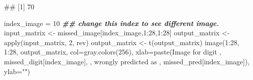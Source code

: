 \documentclass[
  12pt,
]{krantz}
\makeatletter
\newenvironment{Shaded}{\begin{snugshade}}{\end{snugshade}}
\newcommand{\AttributeTok}[1]{\textcolor[rgb]{0.61,0.61,0.61}{#1}}
\newcommand{\DecValTok}[1]{\textcolor[rgb]{0.06,0.06,0.06}{#1}}
\newcommand{\DocumentationTok}[1]{\textcolor[rgb]{0.37,0.37,0.37}{\textbf{\textit{#1}}}}
\newcommand{\FunctionTok}[1]{\textcolor[rgb]{0,0,0}{#1}}
\newcommand{\NormalTok}[1]{#1}
\newcommand{\OtherTok}[1]{\textcolor[rgb]{0.37,0.37,0.37}{#1}}
\newcommand{\SpecialCharTok}[1]{\textcolor[rgb]{0,0,0}{#1}}
\newcommand{\StringTok}[1]{\textcolor[rgb]{0.5,0.5,0.5}{#1}}
\newenvironment{kframe}{%
\medskip{}
\setlength{\fboxsep}{.8em}
 \def\at@end@of@kframe{}%
 \ifinner\ifhmode%
  \def\at@end@of@kframe{\end{minipage}}%
  \begin{minipage}{\columnwidth}%
 \fi\fi%
 \def\FrameCommand##1{\hskip\@totalleftmargin \hskip-\fboxsep
 \colorbox{shadecolor}{##1}\hskip-\fboxsep
     \hskip-\linewidth \hskip-\@totalleftmargin \hskip\columnwidth}%
 \MakeFramed {\advance\hsize-\width
   \@totalleftmargin\z@ \linewidth\hsize
   \@setminipage}}%
 {\par\unskip\endMakeFramed%
 \at@end@of@kframe}
\renewenvironment{Shaded}{\begin{kframe}}{\end{kframe}}
\makeatother
\begin{document}
\begin{Shaded}
\begin{Highlighting}[]
\NormalTok{\#\# [1] 70}
\end{Highlighting}
\end{Shaded}

\begin{Shaded}
\end{Shaded}

\begin{Shaded}
\begin{Highlighting}[]
\NormalTok{index\_image }\OtherTok{=} \DecValTok{10} \DocumentationTok{\#\# change this index to see different image.}
\NormalTok{input\_matrix }\OtherTok{\textless{}{-}}\NormalTok{ missed\_image[index\_image,}\DecValTok{1}\SpecialCharTok{:}\DecValTok{28}\NormalTok{,}\DecValTok{1}\SpecialCharTok{:}\DecValTok{28}\NormalTok{]}
\NormalTok{output\_matrix }\OtherTok{\textless{}{-}} \FunctionTok{apply}\NormalTok{(input\_matrix, }\DecValTok{2}\NormalTok{, rev)}
\NormalTok{output\_matrix }\OtherTok{\textless{}{-}} \FunctionTok{t}\NormalTok{(output\_matrix)}
\FunctionTok{image}\NormalTok{(}\DecValTok{1}\SpecialCharTok{:}\DecValTok{28}\NormalTok{, }\DecValTok{1}\SpecialCharTok{:}\DecValTok{28}\NormalTok{, output\_matrix, }\AttributeTok{col=}\FunctionTok{gray.colors}\NormalTok{(}\DecValTok{256}\NormalTok{),}
\AttributeTok{xlab=}\FunctionTok{paste}\NormalTok{(}\StringTok{\textquotesingle{}Image for digit \textquotesingle{}}\NormalTok{, missed\_digit[index\_image], }\StringTok{\textquotesingle{},}
\StringTok{wrongly predicted as \textquotesingle{}}\NormalTok{, missed\_pred[index\_image]), }\AttributeTok{ylab=}\StringTok{""}\NormalTok{)}
\end{Highlighting}
\end{Shaded}
\end{document}
